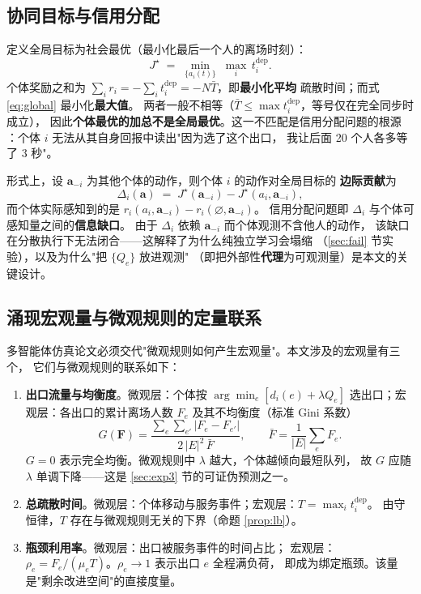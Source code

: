 \subsection{协同目标与信用分配}
\label{sec:credit}

定义全局目标为社会最优（最小化最后一个人的离场时刻）：
\begin{equation}
  J^\star \;=\; \min_{\{a_i(t)\}} \; \max_i\, t_i^{\text{dep}} .
  \label{eq:global}
\end{equation}
个体奖励之和为 $\sum_i r_i=-\sum_i t_i^{\text{dep}}=-N\bar T$，即\textbf{最小化平均}
疏散时间；而式 \eqref{eq:global} 最小化\textbf{最大值}。
两者一般不相等（$\bar T\le\max t_i^{\text{dep}}$，等号仅在完全同步时成立），
因此\textbf{个体最优的加总不是全局最优}。这一不匹配是信用分配问题的根源
\cite{foerster2018coma}：个体 $i$ 无法从其自身回报中读出"因为选了这个出口，
我让后面 20 个人各多等了 3 秒"。

形式上，设 $\mathbf a_{-i}$ 为其他个体的动作，则个体 $i$ 的动作对全局目标的
\textbf{边际贡献}为
\begin{equation}
  \Delta_i(\mathbf a)
  \;=\;
  J^\star(\mathbf a_{-i})
  -
  J^\star(a_i,\mathbf a_{-i}),
  \label{eq:credit}
\end{equation}
而个体实际感知到的是 $r_i(a_i,\mathbf a_{-i})-r_i(\varnothing,\mathbf a_{-i})$。
信用分配问题即 $\Delta_i$ 与个体可感知量之间的\textbf{信息缺口}。
由于 $\Delta_i$ 依赖 $\mathbf a_{-i}$ 而个体观测不含他人的动作，
该缺口在分散执行下无法闭合——这解释了为什么纯独立学习会塌缩
（\ref{sec:fail} 节实验），以及为什么"把 $\{Q_e\}$ 放进观测"
（即把外部性\textbf{代理}为可观测量）是本文的关键设计。

\subsection{涌现宏观量与微观规则的定量联系}
\label{sec:emergence}

多智能体仿真论文必须交代"微观规则如何产生宏观量"。本文涉及的宏观量有三个，
它们与微观规则的联系如下：

\begin{enumerate}
  \item \textbf{出口流量与均衡度}。微观层：个体按 $\arg\min_e[d_i(e)+\lambda Q_e]$
        选出口；宏观层：各出口的累计离场人数 $F_e$ 及其不均衡度（标准 Gini 系数）
        \begin{equation}
          G(\mathbf F)=\frac{\sum_{e}\sum_{e'} |F_e-F_{e'}|}{2\,|E|^2\,\bar F},
          \qquad \bar F=\frac{1}{|E|}\sum_e F_e .
          \label{eq:gini}
        \end{equation}
        $G=0$ 表示完全均衡。微观规则中 $\lambda$ 越大，个体越倾向最短队列，
        故 $G$ 应随 $\lambda$ 单调下降——这是 \ref{sec:exp3} 节的可证伪预测之一。
  \item \textbf{总疏散时间}。微观层：个体移动与服务事件；宏观层：$T=\max_i t_i^{\text{dep}}$。
        由守恒律，$T$ 存在与微观规则无关的下界（命题 \ref{prop:lb}）。
  \item \textbf{瓶颈利用率}。微观层：出口被服务事件的时间占比；
        宏观层：$\rho_e=F_e/(\mu_e T)$。$\rho_e\to1$ 表示出口 $e$ 全程满负荷，
        即成为绑定瓶颈。该量是"剩余改进空间"的直接度量。
\end{enumerate}

